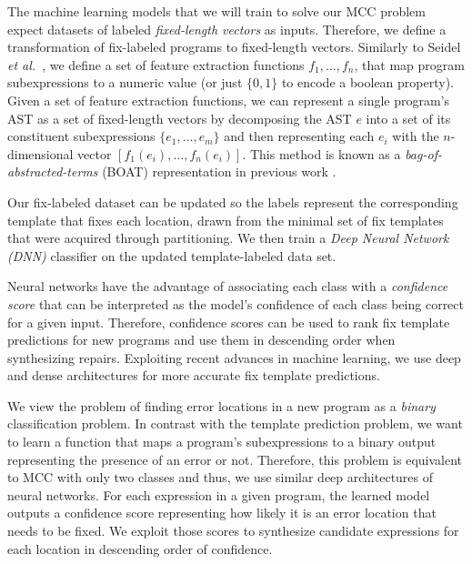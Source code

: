  The machine learning models that we will train to
solve our MCC problem expect datasets of labeled \emph{fixed-length vectors} as
inputs. Therefore, we define a transformation of fix-labeled programs to
fixed-length vectors. Similarly to Seidel \emph{et al.}~\citep{Seidel:2017}, we
define a set of feature extraction functions $f_1, \ldots, f_n$, that map
program subexpressions to a numeric value (or just $\{0, 1\}$ to encode a
boolean property). Given a set of feature extraction functions, we can represent
a single program's AST as a set of fixed-length vectors by decomposing the AST
$e$ into a set of its constituent subexpressions $\{e_1, \ldots, e_m\}$ and then
representing each $e_i$ with the $n$-dimensional vector $[f_1(e_i), \ldots,
f_n(e_i)]$. This method is known as a \emph{bag-of-abstracted-terms} (BOAT)
representation in previous work \citep{Seidel:2017}.

Our fix-labeled dataset can be updated so the labels represent the corresponding
template that fixes each location, drawn from the minimal set of fix templates
that were acquired through partitioning. We then train a \emph{Deep Neural
Network (DNN)} classifier on the updated template-labeled data set.

Neural networks have the advantage of associating each class with a
\emph{confidence score} that can be interpreted as the model's confidence of
each class being correct for a given input. Therefore, confidence scores can be
used to rank fix template predictions for new programs and use them in
descending order when synthesizing repairs. Exploiting recent advances in
machine learning, we use deep and dense architectures \citep{Schmidhuber_2015}
for more accurate fix template predictions.

 We view the problem of finding error locations in a
new program as a \emph{binary} classification problem. In contrast with the
template prediction problem, we want to learn a function that maps a program's
subexpressions to a binary output representing the presence of an error or not.
Therefore, this problem is equivalent to MCC with only two classes and thus, we
use similar deep architectures of neural networks. For each expression in a
given program, the learned model outputs a confidence score representing how
likely it is an error location that needs to be fixed. We exploit those scores
to synthesize candidate expressions for each location in descending order of
confidence.


